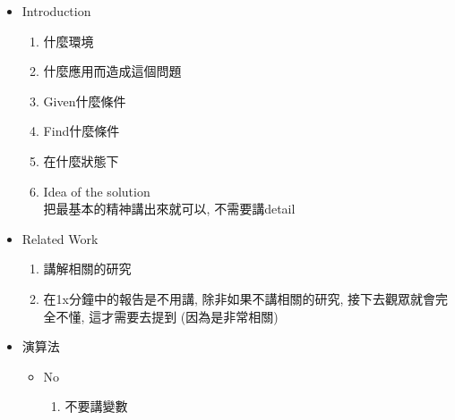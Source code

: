 \begin{enumerate}
{\begin{itemize}
      \item
      {
        Introduction
        \begin{enumerate}
          \item
          {
            什麼環境
          } %

          \item
          {
            什麼應用而造成這個問題
          } %

          \item
          {
            Given什麼條件
          } %

          \item
          {
            Find什麼條件
          } %

          \item
          {
            在什麼狀態下
          } %

          \item
          {
            Idea of the solution\\
            把最基本的精神講出來就可以, 不需要講detail
          } %
        \end{enumerate}
      } %

      \item
      {
        Related Work
        \begin{enumerate}
          \item
          {
            講解相關的研究
          } %

          \item
          {
            在1x分鐘中的報告是不用講, 除非如果不講相關的研究, 接下去觀眾就會完全不懂, 這才需要去提到 (因為是非常相關)
          } %
        \end{enumerate}
      } %

      \item
      {
        演算法
        \begin{itemize}
          \item
          {
            No
            \begin{enumerate}
              \item
              {
                不要講變數
              } %


\end{enumerate}}
\end{itemize}}
\end{itemize}}
\end{enumerate}

